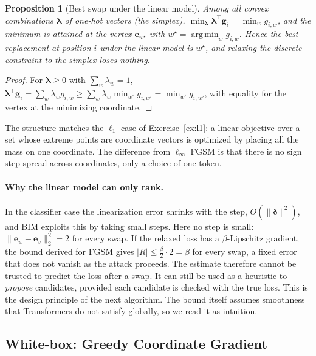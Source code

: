 \documentclass[10pt,a4paper]{extarticle}
\newtheorem{proposition}[theorem]{Proposition}
\theoremstyle{definition}
\newcommand{\bdelta}{\boldsymbol{\delta}}
\DeclareMathOperator*{\argmin}{arg\,min}
\begin{document}
\begin{proposition}[Best swap under the linear model]\label{prop:swap}
Among all convex combinations \(\boldsymbol{\lambda}\) of one-hot vectors (the simplex), \(\min_{\boldsymbol{\lambda}}\boldsymbol{\lambda}^\top\mathbf{g}_i=\min_w g_{i,w}\), and the minimum is attained at the vertex \(\mathbf{e}_{w^\star}\) with \(w^\star=\argmin_w g_{i,w}\). Hence the best replacement at position \(i\) under the linear model is \(w^\star\), and relaxing the discrete constraint to the simplex loses nothing.
\end{proposition}

\begin{proof}
For \(\boldsymbol{\lambda}\ge0\) with \(\sum_w\lambda_w=1\), \(\boldsymbol{\lambda}^\top\mathbf{g}_i=\sum_w\lambda_wg_{i,w}\ge\sum_w\lambda_w\min_{w'}g_{i,w'}=\min_{w'}g_{i,w'}\), with equality for the vertex at the minimizing coordinate.
\end{proof}

The structure matches the \(\ell_1\) case of Exercise~\ref{ex:l1}: a linear objective over a set whose extreme points are coordinate vectors is optimized by placing all the mass on one coordinate. The difference from \(\ell_\infty\) FGSM is that there is no sign step spread across coordinates, only a choice of one token.

\paragraph{Why the linear model can only rank.} In the classifier case the linearization error shrinks with the step, \(O(\|\bdelta\|^2)\), and BIM exploits this by taking small steps. Here no step is small: \(\|\mathbf{e}_w-\mathbf{e}_v\|_2^2=2\) for every swap. If the relaxed loss has a \(\beta\)-Lipschitz gradient, the bound derived for FGSM gives \(|R|\le\tfrac{\beta}{2}\cdot2=\beta\) for every swap, a fixed error that does not vanish as the attack proceeds. The estimate therefore cannot be trusted to predict the loss after a swap. It can still be used as a heuristic to \emph{propose} candidates, provided each candidate is checked with the true loss. This is the design principle of the next algorithm. The bound itself assumes smoothness that Transformers do not satisfy globally, so we read it as intuition.

\subsection{White-box: Greedy Coordinate Gradient}
\end{document}
